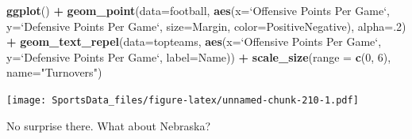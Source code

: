 \documentclass[]{book}
\newenvironment{Shaded}{\begin{snugshade}}{\end{snugshade}}
\newcommand{\DataTypeTok}[1]{\textcolor[rgb]{0.13,0.29,0.53}{#1}}
\newcommand{\DecValTok}[1]{\textcolor[rgb]{0.00,0.00,0.81}{#1}}
\newcommand{\KeywordTok}[1]{\textcolor[rgb]{0.13,0.29,0.53}{\textbf{#1}}}
\newcommand{\NormalTok}[1]{#1}
\newcommand{\OperatorTok}[1]{\textcolor[rgb]{0.81,0.36,0.00}{\textbf{#1}}}
\newcommand{\StringTok}[1]{\textcolor[rgb]{0.31,0.60,0.02}{#1}}
\begin{document}
\begin{Shaded}
\begin{Highlighting}[]
\KeywordTok{ggplot}\NormalTok{() }\OperatorTok{+}
\StringTok{  }\KeywordTok{geom_point}\NormalTok{(}\DataTypeTok{data=}\NormalTok{football, }\KeywordTok{aes}\NormalTok{(}\DataTypeTok{x=}\StringTok{`}\DataTypeTok{Offensive Points Per Game}\StringTok{`}\NormalTok{, }\DataTypeTok{y=}\StringTok{`}\DataTypeTok{Defensive Points Per Game}\StringTok{`}\NormalTok{, }\DataTypeTok{size=}\NormalTok{Margin, }\DataTypeTok{color=}\NormalTok{PositiveNegative), }\DataTypeTok{alpha=}\NormalTok{.}\DecValTok{2}\NormalTok{) }\OperatorTok{+}
\StringTok{  }\KeywordTok{geom_text_repel}\NormalTok{(}\DataTypeTok{data=}\NormalTok{topteams, }\KeywordTok{aes}\NormalTok{(}\DataTypeTok{x=}\StringTok{`}\DataTypeTok{Offensive Points Per Game}\StringTok{`}\NormalTok{, }\DataTypeTok{y=}\StringTok{`}\DataTypeTok{Defensive Points Per Game}\StringTok{`}\NormalTok{, }\DataTypeTok{label=}\NormalTok{Name)) }\OperatorTok{+}\StringTok{ }
\StringTok{  }\KeywordTok{scale_size}\NormalTok{(}\DataTypeTok{range =} \KeywordTok{c}\NormalTok{(}\DecValTok{0}\NormalTok{, }\DecValTok{6}\NormalTok{), }\DataTypeTok{name=}\StringTok{"Turnovers"}\NormalTok{)}
\end{Highlighting}
\end{Shaded}

\texttt{[image: SportsData\_files/figure-latex/unnamed-chunk-210-1.pdf]}

No surprise there. What about Nebraska?

\begin{Shaded}
\end{Shaded}
\end{document}
